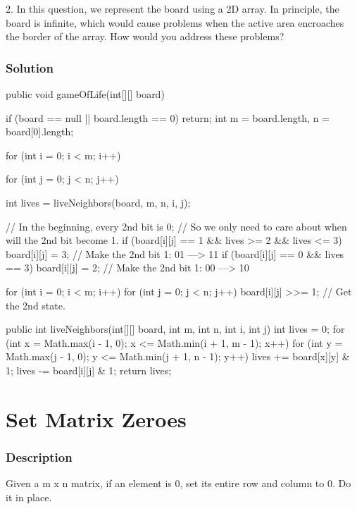 2. In this question, we represent the board using a 2D array. In principle, the board is infinite, which would cause problems when the active area encroaches the border of the array. How would you address these problems?

\subsubsection{Solution}

\begin{Code}
public void gameOfLife(int[][] board) {
    if (board == null || board.length == 0) return;
    int m = board.length, n = board[0].length;

    for (int i = 0; i < m; i++) {
        for (int j = 0; j < n; j++) {
            int lives = liveNeighbors(board, m, n, i, j);

            // In the beginning, every 2nd bit is 0;
            // So we only need to care about when will the 2nd bit become 1.
            if (board[i][j] == 1 && lives >= 2 && lives <= 3) {
                board[i][j] = 3; // Make the 2nd bit 1: 01 ---> 11
            }
            if (board[i][j] == 0 && lives == 3) {
                board[i][j] = 2; // Make the 2nd bit 1: 00 ---> 10
            }
        }
    }

    for (int i = 0; i < m; i++) {
        for (int j = 0; j < n; j++) {
            board[i][j] >>= 1;  // Get the 2nd state.
        }
    }
}

public int liveNeighbors(int[][] board, int m, int n, int i, int j) {
    int lives = 0;
    for (int x = Math.max(i - 1, 0); x <= Math.min(i + 1, m - 1); x++) {
        for (int y = Math.max(j - 1, 0); y <= Math.min(j + 1, n - 1); y++) {
            lives += board[x][y] & 1;
        }
    }
    lives -= board[i][j] & 1;
    return lives;
}
\end{Code}

\newpage

\section{Set Matrix Zeroes} %

\subsubsection{Description}
Given a m x n matrix, if an element is 0, set its entire row and column to 0. Do it in place.

